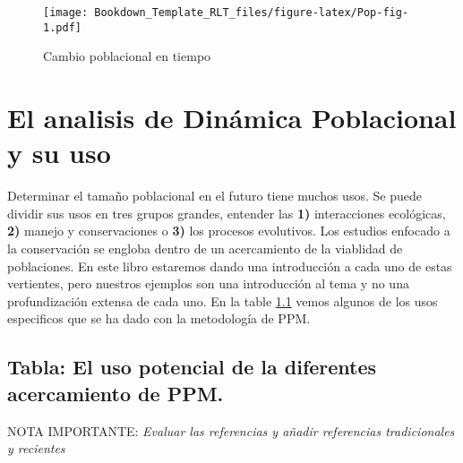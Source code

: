 \documentclass[
]{book}
\theoremstyle{definition}
\theoremstyle{definition}
\theoremstyle{definition}
\theoremstyle{definition}
\theoremstyle{remark}
\begin{document}
\begin{figure}
\centering
\texttt{[image: Bookdown\_Template\_RLT\_files/figure-latex/Pop-fig-1.pdf]}
\caption{\label{fig:Pop-fig}Cambio poblacional en tiempo}
\end{figure}

\hypertarget{el-analisis-de-dinuxe1mica-poblacional-y-su-uso}{%
\section{El analisis de Dinámica Poblacional y su uso}\label{el-analisis-de-dinuxe1mica-poblacional-y-su-uso}}

Determinar el tamaño poblacional en el futuro tiene muchos usos. Se puede dividir sus usos en tres grupos grandes, entender las \textbf{1)} interacciones ecológicas, \textbf{2)} manejo y conservaciones o \textbf{3)} los procesos evolutivos. Los estudios enfocado a la conservación se engloba dentro de un acercamiento de la viablidad de poblaciones. En este libro estaremos dando una introducción a cada uno de estas vertientes, pero nuestros ejemplos son una introducción al tema y no una profundización extensa de cada uno. En la table \ref{USO} vemos algunos de los usos especificos que se ha dado con la metodología de PPM.

\hypertarget{USO}{%
\subsection{Tabla: El uso potencial de la diferentes acercamiento de PPM.}\label{USO}}

NOTA IMPORTANTE: \emph{Evaluar las referencias y añadir referencias tradicionales y recientes}
\end{document}

